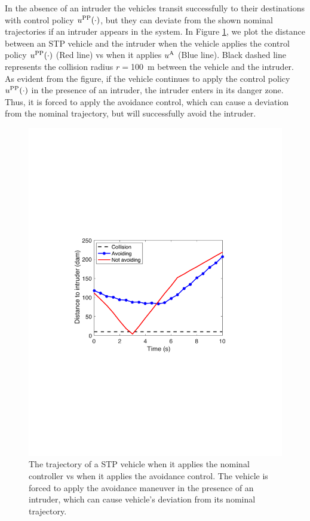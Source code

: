 In the absence of an intruder the vehicles transit successfully to their destinations with control policy $u^{\text{PP}}(\cdot)$, but they can deviate from the shown nominal trajectories if an intruder appears in the system. In Figure \ref{fig:trajComparison}, we plot the distance between an STP vehicle and the intruder when the vehicle applies the control policy $u^{\text{PP}}(\cdot)$ (Red line) vs when it applies ${u^{\text{A}}}$ (Blue line). Black dashed line represents the collision radius $r=$\SI{100}{\m} between the vehicle and the intruder. As evident from the figure, if the vehicle continues to apply the control policy $u^{\text{PP}}(\cdot)$ in the presence of an intruder, the intruder enters in its danger zone. Thus, it is forced to apply the avoidance control, which can cause a deviation from the nominal trajectory, but will successfully avoid the intruder.
\begin{figure}[H]
  \centering
  \includegraphics[width=\columnwidth]{"figs/simulateIntruder"}
  \caption{The trajectory of a STP vehicle when it applies the nominal controller vs when it applies the avoidance control. The vehicle is forced to apply the avoidance maneuver in the presence of an intruder, which can cause vehicle's deviation from its nominal trajectory.}
  \label{fig:trajComparison}
\end{figure}

